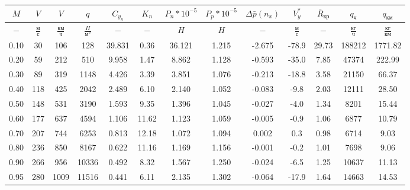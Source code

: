 \begin{tabular}{|c|c|c|c|c|c|c|c|c|c|c|c|c|}
\hline
$M$ & $V$ & $V$ & $q$ & $C_{y_n}$ & $K_n$ & $P_n*10^{-5}$ & $P_p*10^{-5}$ & $\Delta \bar{p}(n_x)$ & $V_y^*$ & $\bar{R}_{кр}$ & $q_{ч}$ & $q_{км}$ \\ 
\hline
$-$ & $\frac{м}{с}$ & $\frac{км}{ч}$ & $\frac{H}{м^2}$ & $-$ & $-$ & $H$ & $H$ & $-$ & $\frac{м}{с}$ & $-$ & $\frac{кг}{ч}$ & $\frac{кг}{км}$ \\ 
\hline
0.10 & 30 & 106 & 128 & 39.831 & 0.36 & 36.121 & 1.215 & -2.675 & -78.9 & 29.73 & 188212 & 1771.82 \\ 
\hline
0.20 & 59 & 212 & 510 & 9.958 & 1.47 & 8.862 & 1.128 & -0.593 & -35.0 & 7.85 & 47374 & 222.99 \\ 
\hline
0.30 & 89 & 319 & 1148 & 4.426 & 3.39 & 3.851 & 1.076 & -0.213 & -18.8 & 3.58 & 21150 & 66.37 \\ 
\hline
0.40 & 118 & 425 & 2042 & 2.489 & 6.10 & 2.140 & 1.052 & -0.083 & -9.8 & 2.03 & 12111 & 28.50 \\ 
\hline
0.50 & 148 & 531 & 3190 & 1.593 & 9.35 & 1.396 & 1.045 & -0.027 & -4.0 & 1.34 & 8201 & 15.44 \\ 
\hline
0.60 & 177 & 637 & 4594 & 1.106 & 11.62 & 1.123 & 1.059 & -0.005 & -0.9 & 1.06 & 6877 & 10.79 \\ 
\hline
0.70 & 207 & 744 & 6253 & 0.813 & 12.18 & 1.072 & 1.094 & 0.002 & 0.3 & 0.98 & 6714 & 9.03 \\ 
\hline
0.80 & 236 & 850 & 8167 & 0.622 & 11.16 & 1.169 & 1.156 & -0.001 & -0.2 & 1.01 & 7698 & 9.06 \\ 
\hline
0.90 & 266 & 956 & 10336 & 0.492 & 8.32 & 1.567 & 1.250 & -0.024 & -6.5 & 1.25 & 10637 & 11.13 \\ 
\hline
0.95 & 280 & 1009 & 11516 & 0.441 & 6.11 & 2.135 & 1.302 & -0.064 & -17.9 & 1.64 & 14663 & 14.53 \\ 
\hline
\end{tabular}